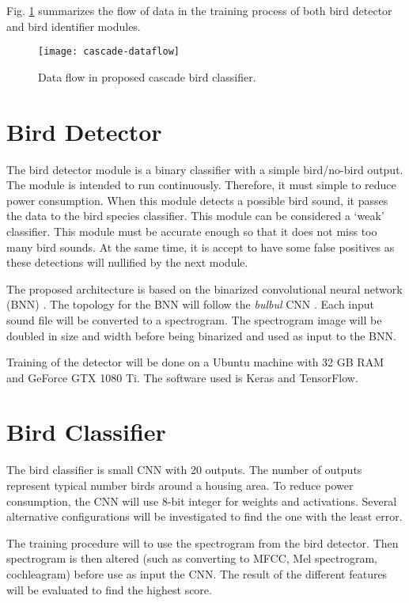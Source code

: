  Fig. \ref{cascade-dataflow} summarizes the flow of data in the training process of both bird detector and bird identifier modules.


\begin{figure}%
\centering
\texttt{[image: cascade-dataflow]}
\caption{Data flow in proposed cascade bird classifier.}
\label{cascade-dataflow}
\end{figure}




\section{Bird Detector}

The bird detector module is a binary classifier with a simple bird/no-bird output.
The module is intended to run continuously. Therefore, it must simple to reduce power consumption.
When this module detects a possible bird sound,  it passes the data to the bird species classifier.
This module can be considered a `weak' classifier. 
This module must be accurate enough so that it does not miss too many bird sounds.
At the same time, it is accept to have some false positives as these detections will nullified by the next module.

The proposed architecture is based on the binarized convolutional neural network (BNN)  \cite{Courbariaux2015,Simons2019}.
The topology for the BNN will follow the \textit{bulbul} CNN \cite{Grill2017}.
Each input sound file will be converted to a spectrogram.
The spectrogram image will be doubled in size and width before being binarized and used as input to the BNN.

Training of the detector will be done on a Ubuntu machine with 32 GB RAM and GeForce GTX 1080 Ti.
The software used is Keras and TensorFlow.

\section{Bird Classifier}

The bird classifier is small CNN with 20 outputs.
The number of outputs represent typical number birds around a housing area.
To reduce power consumption, the CNN will use 8-bit integer for weights and activations.
Several alternative configurations will be investigated to find the one with the least error.

The training procedure will to use the spectrogram from the bird detector.
Then spectrogram is then altered (such as converting to MFCC, Mel spectrogram, cochleagram) before use as input the CNN. The result of the different features will be evaluated to find the highest score.

